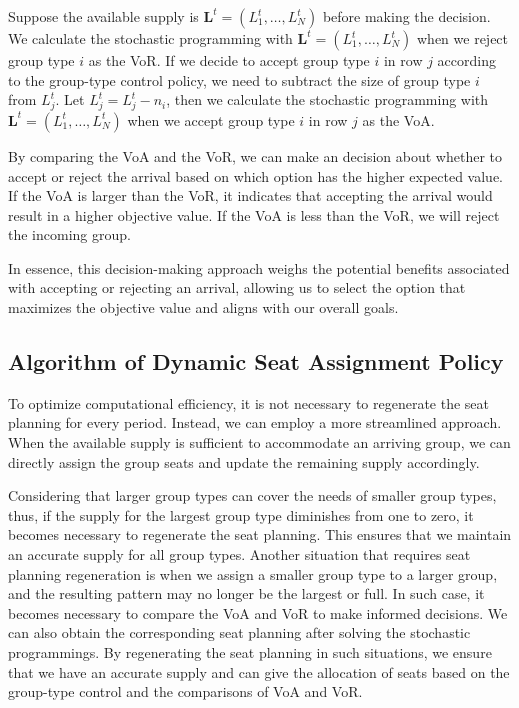 Suppose the available supply is $\mathbf{L}^{t} = (L_1^{t}, \ldots, L_N^{t})$ before making the decision. We calculate the stochastic programming with $\mathbf{L}^{t}= (L_1^{t}, \ldots, L_N^{t})$ when we reject group type $i$ as the VoR. If we decide to accept group type $i$ in row $j$ according to the group-type control policy, we need to subtract the size of group type $i$ from $L_j^{t}$. Let $L_j^{t} = L_j^{t} - n_{i}$, then we calculate the stochastic programming with $\mathbf{L}^{t}= (L_1^{t}, \ldots, L_N^{t})$ when we accept group type $i$ in row $j$ as the VoA.

By comparing the VoA and the VoR, we can make an decision about whether to accept or reject the arrival based on which option has the higher expected value. If the VoA is larger than the VoR, it indicates that accepting the arrival would result in a higher objective value. If the VoA is less than the VoR, we will reject the incoming group.



In essence, this decision-making approach weighs the potential benefits associated with accepting or rejecting an arrival, allowing us to select the option that maximizes the objective value and aligns with our overall goals.


\subsection{Algorithm of Dynamic Seat Assignment Policy}
To optimize computational efficiency, it is not necessary to regenerate the seat planning for every period. Instead, we can employ a more streamlined approach. When the available supply is sufficient to accommodate an arriving group, we can directly assign the group seats and update the remaining supply accordingly.

Considering that larger group types can cover the needs of smaller group types, thus, if the supply for the largest group type diminishes from one to zero, it becomes necessary to regenerate the seat planning. This ensures that we maintain an accurate supply for all group types.
Another situation that requires seat planning regeneration is when we assign a smaller group type to a larger group, and the resulting pattern may no longer be the largest or full. In such case, it becomes necessary to compare the VoA and VoR to make informed decisions. We can also obtain the corresponding seat planning after solving the stochastic programmings. By regenerating the seat planning in such situations, we ensure that we have an accurate supply and can give the allocation of seats based on the group-type control and the comparisons of VoA and VoR.


